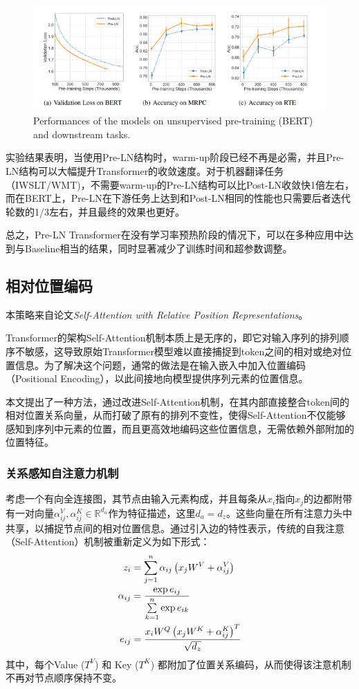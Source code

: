 \begin{figure}[ht]
    \centering
    \includegraphics[width=14cm]{img/LN/LN-5.jpg}
    \caption{Performances of the models on unsupervised pre-training (BERT) and downstream tasks.}
    \label{fig:bert}
\end{figure}

实验结果表明，当使用Pre-LN结构时，warm-up阶段已经不再是必需，并且Pre-LN结构可以大幅提升Transformer的收敛速度。对于机器翻译任务（IWSLT/WMT)，不需要warm-up的Pre-LN结构可以比Post-LN收敛快1倍左右，而在BERT上，Pre-LN在下游任务上达到和Post-LN相同的性能也只需要后者迭代轮数的1/3左右，并且最终的效果也更好。

总之，Pre-LN Transformer在没有学习率预热阶段的情况下，可以在多种应用中达到与Baseline相当的结果，同时显著减少了训练时间和超参数调整。

\subsection{相对位置编码}\label{sec-4:rel-pos-encoding}
本策略来自论文\textit{Self-Attention with Relative Position Representations}\citep{shawSelfAttentionRelativePosition2018}。

Transformer的架构Self-Attention机制本质上是无序的，即它对输入序列的排列顺序不敏感，这导致原始Transformer模型难以直接捕捉到token之间的相对或绝对位置信息。为了解决这个问题，通常的做法是在输入嵌入中加入位置编码（Positional Encoding），以此间接地向模型提供序列元素的位置信息。

本文提出了一种方法，通过改进Self-Attention机制，在其内部直接整合token间的相对位置关系向量，从而打破了原有的排列不变性，使得Self-Attention不仅能够感知到序列中元素的位置，而且更高效地编码这些位置信息，无需依赖外部附加的位置特征。
\subsubsection{关系感知自注意力机制}
考虑一个有向全连接图，其节点由输入元素构成，并且每条从$x_i$指向$x_j$的边都附带有一对向量$\alpha_{ij}^V, \alpha_{ij}^K \in \mathbb{R}^{d_\alpha}$作为特征描述，这里$d_a = d_z$。这些向量在所有注意力头中共享，以捕捉节点间的相对位置信息。通过引入边的特性表示，传统的自我注意（Self-Attention）机制被重新定义为如下形式：
\begin{align*}
    z_i &= \sum_{j=1}^{n} \alpha_{ij} \left( x_j W^V + \alpha_{ij}^V \right)\\
    \alpha_{ij} &= \frac{\exp e_{ij}}{\overunderset{n}{k=1}{\sum}\exp e_{ik}}\\
    e_{ij} &= \frac{x_i W^Q \left( x_j W^K + \alpha_{ij}^K \right)^T}{\sqrt{d_z}}
\end{align*}
其中，每个Value ($T^V$) 和 Key ($T^K$) 都附加了位置关系编码，从而使得该注意机制不再对节点顺序保持不变。
